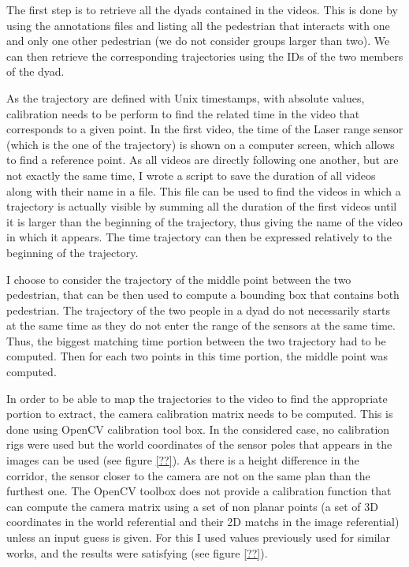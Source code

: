 \documentclass[12pt,a4paper,twoside]{article}
\begin{document}
The first step is to retrieve all the dyads contained in the videos. This is done by using the annotations files and listing all the pedestrian that interacts with one and only one other pedestrian (we do not consider groups larger than two). We can then retrieve the corresponding trajectories using the IDs of the two members of the dyad.

As the trajectory are defined with Unix timestamps, with absolute values, calibration needs to be perform to find the related time in the video that corresponds to a given point. In the first video, the time of the Laser range sensor (which is the one of the trajectory) is shown on a computer screen, which allows to find a reference point. As all videos are directly following one another, but are not exactly the same time, I wrote a script to save the duration of all videos along with their name in a file. This file can be used to find the videos in which a trajectory is actually visible by summing all the duration of the first videos until it is larger than the beginning of the trajectory, thus giving the name of the video in which it appears. The time trajectory can then be expressed relatively to the beginning of the trajectory. 

I choose to consider the trajectory of the middle point between the two pedestrian, that can be then used to compute a bounding box that contains both pedestrian. The trajectory of the two people in a dyad do not necessarily starts at the same time as they do not enter the range of the sensors at the same time. Thus, the biggest matching time portion between the two trajectory had to be computed. Then for each two points in this time portion, the middle point was computed.

In order to be able to map the trajectories to the video to find the appropriate portion to extract, the camera calibration matrix needs to be computed. This is done using OpenCV calibration tool box. In the considered case, no calibration rigs were used but the world coordinates of the sensor poles that appears in the images can be used (see figure \ref{??}). As there is a height difference in the corridor, the sensor closer to the camera are not on the same plan than the furthest one. The OpenCV toolbox does not provide a calibration function that can compute the camera matrix using a set of non planar points (a set of 3D coordinates in the world referential and their 2D matchs in the image referential) unless an input guess is given. For this I used values previously used for similar works, and the results were satisfying (see figure \ref{??}).
\end{document}
